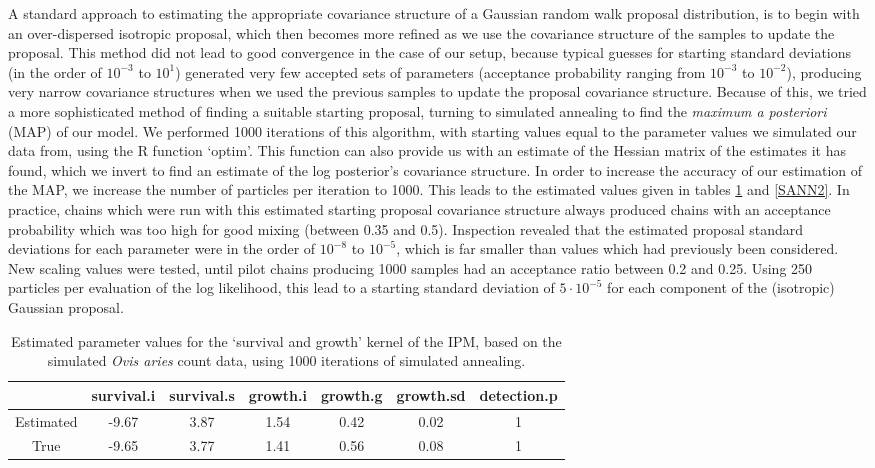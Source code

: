 \documentclass[a4paper,12pt]{article}
\begin{document}
A standard approach to estimating the appropriate covariance structure of a Gaussian random walk proposal distribution, is to begin with an over-dispersed isotropic proposal, which then becomes more refined as we use the covariance structure of the samples to update the proposal. This method did not lead to good convergence in the case of our setup, because typical guesses for starting standard deviations (in the order of $10^{-3}$ to $10^{1}$) generated very few accepted sets of parameters (acceptance probability ranging from $10^{-3}$ to $10^{-2}$), producing very narrow covariance structures when we used the previous samples to update the proposal covariance structure. Because of this, we tried a more sophisticated method of finding a suitable starting proposal, turning to simulated annealing to find the \textit{maximum a posteriori} (MAP) of our model. We performed 1000 iterations of this algorithm, with starting values equal to the parameter values we simulated our data from, using the R function `optim'. This function can also provide us with an estimate of the Hessian matrix of the estimates it has found, which we invert to find an estimate of the log posterior's covariance structure. In order to increase the accuracy of our estimation of the MAP, we increase the number of particles per iteration to 1000. This leads to the estimated values given in tables \ref{SANN1} and \ref{SANN2}. In practice, chains which were run with this estimated starting proposal covariance structure always produced chains with an acceptance probability which was too high for good mixing (between 0.35 and 0.5). Inspection revealed that the estimated proposal standard deviations for each parameter were in the order of $10^{-8}$ to $10^{-5}$, which is far smaller than values which had previously been considered. New scaling values were tested, until pilot chains producing 1000 samples had an acceptance ratio between 0.2 and 0.25. Using 250 particles per evaluation of the log likelihood, this lead to a starting standard deviation of $5 \cdot 10^{-5}$ for each component of the (isotropic) Gaussian proposal. \\

\begin{table}[ht]
\centering
\begin{tabular}{ccccccc}
  \hline
 & survival.i & survival.s & growth.i & growth.g & growth.sd & detection.p \\ 
  \hline
Estimated & -9.67 & 3.87 & 1.54 & 0.42 & 0.02 & 1 \\ 
  True & -9.65 & 3.77 & 1.41 & 0.56 & 0.08 & 1 \\ 
   \hline
\end{tabular}
\caption{\label{SANN1}Estimated parameter values for the `survival and growth' kernel of the IPM, based on the simulated \textit{Ovis aries} count data, using 1000 iterations of simulated annealing.}
\end{table}
\end{document}
